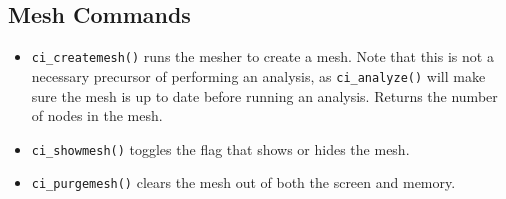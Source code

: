 \subsection{Mesh Commands}

\begin{itemize}
\item \texttt{ci\_createmesh()} runs the mesher to create a mesh. Note that this is not
a necessary precursor of performing an analysis, as
\texttt{ci\_analyze()} will make sure the mesh is up to date before
running an analysis. Returns the number of nodes in the mesh.

\item \texttt{ci\_showmesh()} toggles the flag that shows or hides the mesh.

\item \texttt{ci\_purgemesh()} clears the mesh out of both the screen and memory.
\end{itemize}

